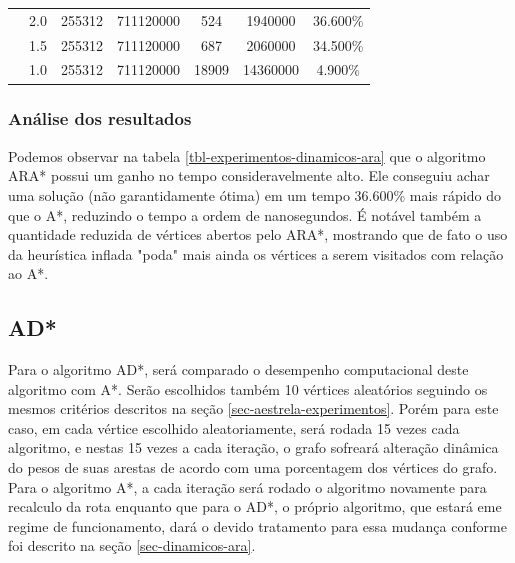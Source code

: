 \begin{table}[H]
\begin{adjustbox}{max width=\textwidth}
\begin{tabular}{|c|c|c|c|c|c|c|}
                                   & 2.0                                     & 255312                               & 711120000                                    & 524                                    & 1940000                                        & 36.600\%                                                       \\ \cline{2-7} 
                                   & 1.5                                     & 255312                               & 711120000                                    & 687                                    & 2060000                                        & 34.500\%                                                       \\ \cline{2-7} 
                                   & 1.0                                     & 255312                               & 711120000                                    & 18909                                  & 14360000                                       & 4.900\%                                                        \\ \hline
\end{tabular}
\end{adjustbox}
\end{table}

\subsubsection{Análise dos resultados}
\label{sec-experimentos-dinamicos-ara-analise}

Podemos observar na tabela \ref{tbl-experimentos-dinamicos-ara} que o algoritmo ARA* possui um ganho no tempo consideravelmente alto. Ele conseguiu achar uma solução (não garantidamente ótima) em um tempo 36.600\% mais rápido do que o A*, reduzindo o tempo a ordem de nanosegundos. É notável também a quantidade reduzida de vértices abertos pelo ARA*, mostrando que de fato o uso da heurística inflada "poda" mais ainda os vértices a serem visitados com relação ao A*.

\subsection{AD*}
\label{sec-experimentos-dinamicos-ad}

Para o algoritmo AD*, será comparado o desempenho computacional deste algoritmo com A*. Serão escolhidos também 10 vértices aleatórios seguindo os mesmos critérios descritos na seção \ref{sec-aestrela-experimentos}. Porém para este caso, em cada vértice escolhido aleatoriamente, será rodada 15 vezes cada algoritmo, e nestas 15 vezes a cada iteração, o grafo sofreará alteração dinâmica do pesos de suas arestas de acordo com uma porcentagem dos vértices do grafo. Para o algoritmo A*, a cada iteração será rodado o algoritmo novamente para recalculo da rota enquanto que para o AD*, o próprio algoritmo, que estará eme regime de funcionamento, dará o devido tratamento para essa mudança conforme foi descrito na seção \ref{sec-dinamicos-ara}.

